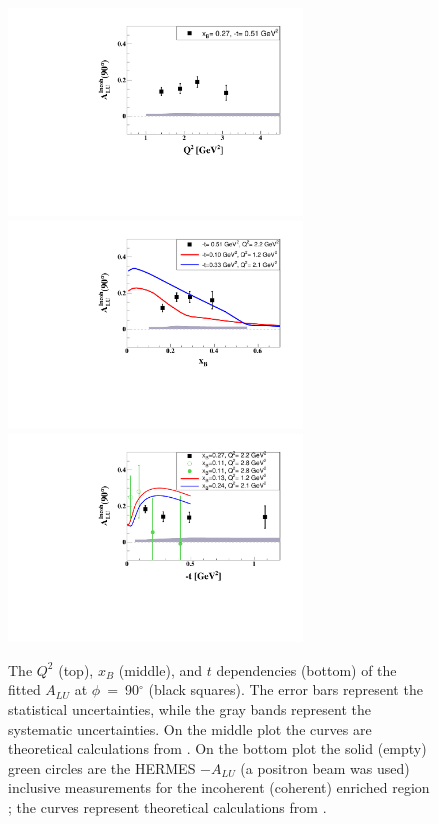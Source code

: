 \documentclass[twocolumn,nofootinbib,prl,superscriptaddress,secnumarabic,amssymb,nobibnotes,aps,floatfix]{revtex4}
\begin{document}
\begin{figure}[tb]
\includegraphics[width=7.8cm]{figs/ALU_90_p_vs_Q2_shortscenrario.pdf}
\includegraphics[width=7.8cm]{figs/ALU_90_p_vs_x_shortscenrario.pdf}
\includegraphics[width=7.8cm]{figs/ALU_90_p_vs_t_shortscenrario.pdf}
\caption{The $Q^{2}$ (top), $x_{B}$ (middle), and $t$ dependencies (bottom) of
   the fitted $A_{LU}$ at $\phi$~=~90$^{\circ}$ (black squares). The error bars 
   represent the statistical uncertainties, while the gray bands represent the 
   systematic uncertainties. On the middle plot the curves are theoretical 
   calculations from \cite{simonetta_2}. On the bottom plot the solid (empty) 
   green circles are the HERMES $-A_{LU}$ (a positron beam was used) inclusive 
   measurements for the incoherent (coherent) enriched region 
   \cite{Airapetian:2009cga}; the curves represent theoretical calculations 
   from \cite{simonetta_2}.  } \label{fig:alu90}
\end{figure}
\end{document}
